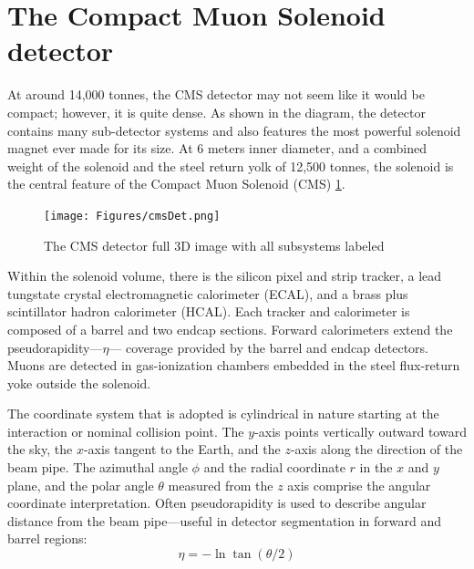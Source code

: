 \section{The Compact Muon Solenoid detector}
At around 14,000 tonnes, the CMS detector may not seem like it would be compact; however, it is quite dense. As shown in the diagram, the detector contains many sub-detector systems and also features the most powerful solenoid magnet ever made for its size. At 6 meters inner diameter, and a combined weight of the solenoid and the steel return yolk of 12,500 tonnes, the solenoid is the central feature of the Compact Muon Solenoid (CMS) \ref{fig:cmsdet}.
\begin{figure}[!htb]
\begin{center}
\texttt{[image: Figures/cmsDet.png]}
\caption{\label{fig:cmsdet}The CMS detector full 3D image with all subsystems labeled}
\end{center}
\end{figure}
 Within the solenoid volume, there is the
silicon pixel and strip tracker, a lead tungstate crystal 
electromagnetic calorimeter (ECAL), and a brass plus scintillator 
hadron calorimeter (HCAL). Each tracker and calorimeter is composed of a barrel and two endcap 
sections. Forward calorimeters extend the pseudorapidity---$\eta$---
coverage provided by the barrel and endcap detectors. 
Muons are detected in gas-ionization chambers embedded 
in the steel flux-return yoke outside the solenoid.

The coordinate system that is adopted is cylindrical in nature starting at the interaction or nominal collision point. The $y$-axis points vertically outward toward the sky, the $x$-axis tangent to the Earth, and the $z$-axis along the direction of the beam pipe. The azimuthal angle $\phi$ and the radial coordinate $r$ in the $x$ and $y$ plane, and the polar angle $\theta$ measured from the $z$ axis comprise the angular coordinate interpretation. Often pseudorapidity is used to describe angular distance from the beam pipe---useful in detector segmentation in forward and barrel regions:
\begin{equation}\eta = - \ln \tan(\theta/2)\end{equation}  



